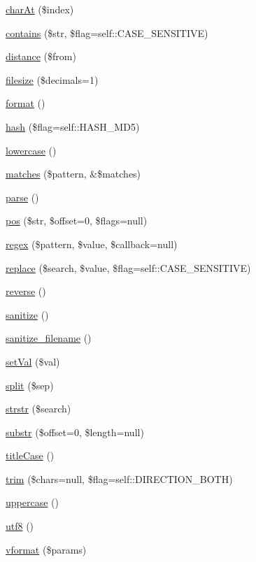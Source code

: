 \begin{DoxyCompactItemize}
\item 
\hyperlink{class_string_a698363ae7a5347c0cb007758a89e5cbb}{charAt} (\$index)
\item 
\hyperlink{class_string_aec22b369ba9dee6dfd32732cf85f4000}{contains} (\$str, \$flag=self::CASE\_\-SENSITIVE)
\item 
\hyperlink{class_string_abd4d863579f9233d11ed5d43734502c3}{distance} (\$from)
\item 
\hyperlink{class_string_a6b17391b3985f04172a23c7de0b3bce9}{filesize} (\$decimals=1)
\item 
\hyperlink{class_string_afe083716d50b3fb4057e519961b9235c}{format} ()
\item 
\hyperlink{class_string_aa79d09f1d6ae12d9c302ed54270034bd}{hash} (\$flag=self::HASH\_\-MD5)
\item 
\hyperlink{class_string_a6efb34f84446ffa3470355a4a2d0a9d5}{lowercase} ()
\item 
\hyperlink{class_string_ad0686854d0fe47b7d00bf86f800b9a06}{matches} (\$pattern, \&\$matches)
\item 
\hyperlink{class_string_a38d99acc70a1d8fd8f94455743b2d237}{parse} ()
\item 
\hyperlink{class_string_a9c6ca2d106fe3b0a72f7aa0e2f704894}{pos} (\$str, \$offset=0, \$flags=null)
\item 
\hyperlink{class_string_aeb68825e311c554f602b99010f3dd0f3}{regex} (\$pattern, \$value, \$callback=null)
\item 
\hyperlink{class_string_a894089d0eef8d85aa01b336657233dd2}{replace} (\$search, \$value, \$flag=self::CASE\_\-SENSITIVE)
\item 
\hyperlink{class_string_a601c54a2a4082e5d8dfc4509b07ea958}{reverse} ()
\item 
\hyperlink{class_string_a1c107fb139f601aed9aa988531ce9ae6}{sanitize} ()
\item 
\hyperlink{class_string_a111eb4c71727fe2f08c666411bdae143}{sanitize\_\-filename} ()
\item 
\hyperlink{class_string_a00ab6264142a8a943de69b29ae8ccab5}{setVal} (\$val)
\item 
\hyperlink{class_string_aa69697aaa850c2ac672ce6ee5d2fe912}{split} (\$sep)
\item 
\hyperlink{class_string_af47ae78159e7eba6401c55c00ad62a8d}{strstr} (\$search)
\item 
\hyperlink{class_string_a21e19c13bc66319d550f5d35f8bdf348}{substr} (\$offset=0, \$length=null)
\item 
\hyperlink{class_string_a4254f7afd191b76d18df0a2d0ef07075}{titleCase} ()
\item 
\hyperlink{class_string_a1d3d79afd2e327acdd483b790d20963c}{trim} (\$chars=null, \$flag=self::DIRECTION\_\-BOTH)
\item 
\hyperlink{class_string_a310867f4a8ce033e14c1ea19424c8982}{uppercase} ()
\item 
\hyperlink{class_string_a30dc704637134d90863106fe32347c69}{utf8} ()
\item 
\hyperlink{class_string_a1f14e496c4c1d64d73f3654c93bcde3e}{vformat} (\$params)
\end{DoxyCompactItemize}
